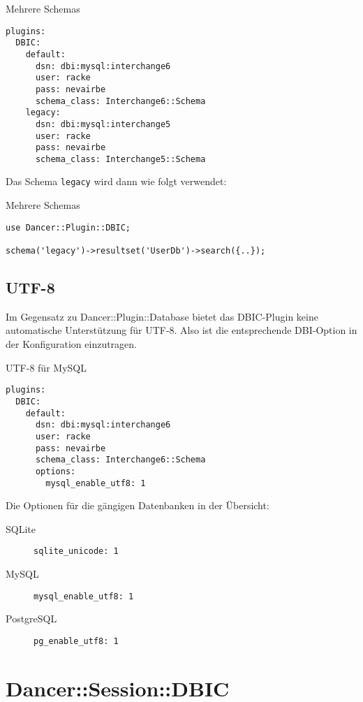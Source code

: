 \begin{frame}[fragile]{Mehrere Schemas}
\begin{lstlisting}
plugins:
  DBIC:
    default:
      dsn: dbi:mysql:interchange6
      user: racke
      pass: nevairbe
      schema_class: Interchange6::Schema
    legacy:
      dsn: dbi:mysql:interchange5
      user: racke
      pass: nevairbe
      schema_class: Interchange5::Schema
\end{lstlisting}
\end{frame}

Das Schema \verb|legacy| wird dann wie folgt verwendet:

\begin{frame}[fragile]{Mehrere Schemas}
\begin{lstlisting}
use Dancer::Plugin::DBIC;

schema('legacy')->resultset('UserDb')->search({..});
\end{lstlisting}
\end{frame}

\subsection{UTF-8}
Im Gegensatz zu Dancer::Plugin::Database bietet das DBIC-Plugin
keine automatische Unterstützung für UTF-8. Also ist die entsprechende
DBI-Option in der Konfiguration einzutragen.
\begin{frame}[fragile]{UTF-8 für MySQL}
\begin{lstlisting}
plugins:
  DBIC:
    default:
      dsn: dbi:mysql:interchange6
      user: racke
      pass: nevairbe
      schema_class: Interchange6::Schema
      options:
        mysql_enable_utf8: 1
\end{lstlisting}
\end{frame}

Die Optionen für die gängigen Datenbanken in der Übersicht:

\begin{description}
\item[SQLite] \verb|sqlite_unicode: 1|
\item[MySQL] \verb|mysql_enable_utf8: 1|
\item[PostgreSQL] \verb|pg_enable_utf8: 1| 
\end{description}

\section{Dancer::Session::DBIC}

